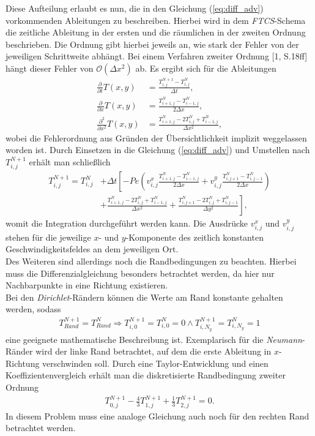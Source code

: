 \documentclass[12pt,a4paper,titlepage,headinclude,bibtotoc]{scrartcl}
\begin{document}
Diese Aufteilung erlaubt es nun, die in den Gleichung (\ref{eq:diff_adv}) vorkommenden Ableitungen zu beschreiben.   
Hierbei wird in dem \textit{FTCS}-Schema die zeitliche Ableitung in der ersten und die räumlichen in der zweiten Ordnung beschrieben. Die Ordnung gibt hierbei jeweils an, wie stark der Fehler von der jeweiligen Schrittweite abhängt. Bei einem Verfahren zweiter Ordnung [1, S.18ff] hängt dieser Fehler von $\mathcal{O}(\Delta x^2)$ ab.
Es ergibt sich für die Ableitungen
\begin{align}
\frac{\partial}{\partial t}T(x,y) &= \frac{T_{i,j}^{N+1} - T_{i,j}^{N}}{\Delta t}, \\
\frac{\partial}{\partial x}T(x,y) &= \frac{T_{i+1,j}^{N} - T_{i-1,j}^{N}}{2 \Delta x}, \\
\frac{\partial^2}{\partial x^2}T(x,y) &= \frac{T_{i+1,j}^{N} - 2 T_{i,j}^{N} + T_{i-1,j}^{N}}{ \Delta x^2},
\end{align}
wobei die Fehlerordnung aus Gründen der Übersichtlichkeit implizit weggelassen worden ist.
Durch Einsetzen in die Gleichung (\ref{eq:diff_adv}) und Umstellen nach $T_{i,j}^{N+1}$ erhält man schließlich %
\begin{align}
\label{eq:ftcs}
T_{i,j}^{N+1} = T_{i,j}^N &+ \Delta t \left[ -Pe \left( v^x_{i,j} \frac{T_{i+1,j}^N-T_{i-1,j}^N}{2\Delta x}+v^y_{i,j} \frac{T_{i,j+1}^N-T_{i,j-1}^N}{2\Delta x} \right) \right. \nonumber \\ 
 & \left.+ \frac{ T_{i+1,j}^N - 2 T_{i,j}^N +  T_{i-1,j}^N }{\Delta x^2} 
+ \frac{ T_{i,j+1}^N - 2  T_{i,j}^N + T_{i,j-1}^N}{\Delta y^2} \right],
\end{align}
womit die Integration durchgeführt werden kann. Die Ausdrücke $v^x_{i,j}$ und $v^y_{i,j}$ stehen für die jeweilige $x$- und $y$-Komponente des zeitlich konstanten Geschwindigkeitsfeldes an dem jeweiligen Ort.\\
Des Weiteren sind allerdings noch die Randbedingungen zu beachten. Hierbei muss die Differenzialgleichung besonders betrachtet werden, da hier nur Nachbarpunkte in eine Richtung existieren.\\
Bei den \textit{Dirichlet}-Rändern können die Werte am Rand konstante gehalten werden, sodass
\begin{align*}
T^{N+1}_{Rand} = T^{N}_{Rand} \Rightarrow T^{N+1}_{i,0} = T^{N}_{i,0} = 0 \land T^{N+1}_{i,N_y} = T^{N}_{i,N_y} = 1
\end{align*}
eine geeignete mathematische Beschreibung ist. Exemplarisch für die \textit{Neumann}-Ränder wird der linke Rand betrachtet, auf dem die erste Ableitung in $x$-Richtung verschwinden soll. Durch eine Taylor-Entwicklung und einen Koeffizientenvergleich erhält man die diskretisierte Randbedingung zweiter Ordnung
\begin{align*}
T_{0,j}^{N+1} - \frac{4}{3} T_{1,j}^{N+1} + \frac{1}{3} T_{2,j}^{N+1} = 0.
\end{align*}
In diesem Problem muss eine analoge Gleichung auch noch für den rechten Rand betrachtet werden.
\end{document}
